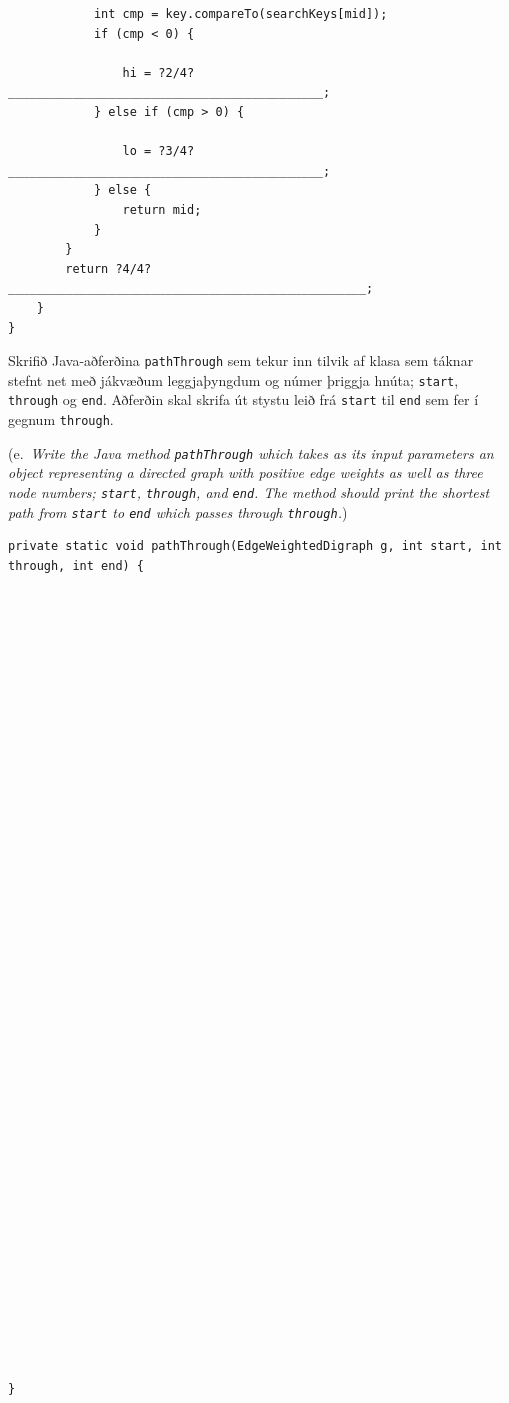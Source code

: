 \documentclass[addpoints]{exam}
\newcommand{\eng}[1]{(e.\ \emph{#1})}
\begin{document}
\begin{questions}
\begin{verbatim}
            int cmp = key.compareTo(searchKeys[mid]);
            if (cmp < 0) {
            
                hi = ?2/4?____________________________________________;
            } else if (cmp > 0) {
            
                lo = ?3/4?____________________________________________;
            } else {
                return mid;
            }
        }
        return ?4/4?__________________________________________________;
    }
}

\end{verbatim}


	\newpage
	\question[4] Skrifið Java-aðferðina \texttt{pathThrough} sem tekur inn tilvik af klasa sem táknar stefnt net með jákvæðum leggjaþyngdum og númer þriggja hnúta; \texttt{start}, \texttt{through} og \texttt{end}. Aðferðin skal skrifa út stystu leið frá \texttt{start} til \texttt{end} sem fer í gegnum \texttt{through}.

	\eng{Write the Java method \texttt{pathThrough} which takes as its input parameters an object representing a directed graph with positive edge weights as well as three node numbers; \texttt{start}, \texttt{through}, and \texttt{end}. The method should print the shortest path from \texttt{start} to \texttt{end} which passes through \texttt{through}.}

	\begin{verbatim}
private static void pathThrough(EdgeWeightedDigraph g, int start, int through, int end) {









































}
\end{verbatim}




\end{questions}
\end{document}
